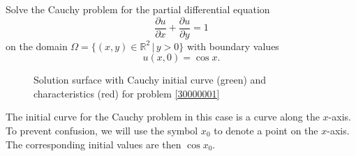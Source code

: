Solve the Cauchy problem for the partial differential equation
\[
\frac{\partial u}{\partial x}
+
\frac{\partial u}{\partial y}
=1
\]
on the domain
$\Omega = \{ (x,y)\in\mathbb R^2\,|\, y > 0\}$
with boundary values
\[
u(x,0)=\cos x.
\]

\begin{loesung}
\begin{figure}
\centering
{}
\caption{Solution surface with Cauchy initial curve (green) and
characteristics (red) for problem \ref{30000001}
\label{30000001:solutionfigure}}
\end{figure}
The initial curve for the Cauchy problem in this case is a curve
along the $x$-axis.
To prevent confusion, we will use the symbol $x_0$ to denote a point
on the $x$-axis. 
The corresponding initial values are then $\cos x_0$.


\end{loesung}
